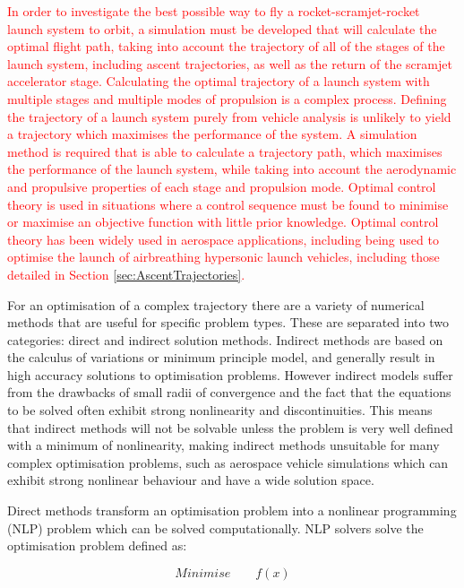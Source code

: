 \textcolor{red}{In order to investigate the best possible way to fly a rocket-scramjet-rocket launch system to orbit, a simulation must be developed that will calculate the optimal flight path, taking into account the trajectory of all of the stages of the launch system, including ascent trajectories, as well as the return of the scramjet accelerator stage. 
Calculating the optimal trajectory of a launch system with multiple stages and multiple modes of propulsion is a complex process. 
Defining the trajectory of a launch system purely from vehicle analysis is unlikely to yield a trajectory which maximises the performance of the system.
A simulation method is required that is able to calculate a trajectory path, which maximises the performance of the launch system, while taking into account the aerodynamic and propulsive properties of each stage and propulsion mode. 
Optimal control theory is used in situations where a control sequence must be found to minimise or maximise an objective function with little prior knowledge. 
Optimal control theory has been widely used in aerospace applications, including being used to optimise the launch of airbreathing hypersonic launch vehicles\cite{Powell1991,Lu1993,Trefny1999,Roche2000,Pescetelli2012,Young2006}, \textcolor{red}{including those detailed in Section \ref{sec:AscentTrajectories}}.
}


For an optimisation of a complex trajectory there are a variety of numerical methods that are useful for specific problem types. These are separated into two categories: direct and indirect solution methods\cite{Betts1998}. Indirect methods are based on the calculus of variations or minimum principle model, and generally result in high accuracy solutions to optimisation problems\cite{Bulirsch1993}. However indirect models suffer from the drawbacks of small radii of convergence and the fact that the equations to be solved often exhibit strong nonlinearity and discontinuities. This means that indirect methods will not be solvable unless the problem is very well defined with a minimum of nonlinearity, making indirect methods unsuitable for many complex optimisation problems, such as aerospace vehicle simulations which can exhibit strong nonlinear behaviour and have a wide solution space. 

Direct methods transform an optimisation problem into a nonlinear programming (NLP) problem which can be solved computationally\cite{Stryk1992}. NLP solvers solve the optimisation problem defined as\cite{Bazaraa2013}:

\begin{equation}
Minimise \qquad f(x)
\end{equation}


